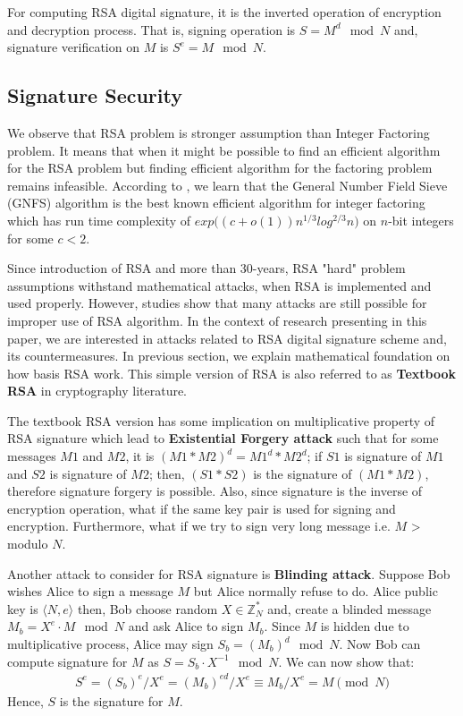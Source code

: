 \documentclass[10pt,sigconf]{acmart}
\newcommand{\Z}{\mathbb{Z}}
\begin{document}
For computing RSA digital signature, it is the inverted operation of encryption and decryption process. That is, signing operation is $S = M^d \mod N$ and, signature verification on $M$ is $S^e = M \mod N$. 

\subsection{Signature Security}

We observe that RSA problem is stronger assumption than Integer Factoring problem. It means that when it might be possible to find an efficient algorithm for the RSA problem but finding efficient algorithm for the factoring problem remains infeasible. According to \cite{case2003beginner}, we learn that the General Number Field Sieve (GNFS) algorithm is the best known efficient algorithm for integer factoring which has run time complexity of $exp\big((c + o(1)) n^{1/3} log^{2/3}n\big)$ on $n$-bit integers for some $c < 2$.

Since introduction of RSA and more than 30-years, RSA "hard" problem assumptions withstand mathematical attacks, when RSA is implemented and used properly. However, studies \cite{boneh1999twenty} \cite{coppersmith1997small} \cite{coron2000new} show that many attacks are still possible for improper use of RSA algorithm. In the context of research presenting in this paper, we are interested in attacks related to RSA digital signature scheme and, its countermeasures. In previous section, we explain mathematical foundation on how basis RSA work. This simple version of RSA is also referred to as \textbf{Textbook RSA} in cryptography literature. 

The textbook RSA version has some implication on multiplicative property of RSA signature which lead to \textbf{Existential Forgery attack} such that for some messages $M1$ and $M2$, it is $(M1 * M2)^d = M1^d * M2^d$; if $S1$ is signature of $M1$ and $S2$ is signature of $M2$; then, $(S1 * S2)$ is the signature of $(M1 * M2)$, therefore signature forgery is possible. Also, since signature is the inverse of encryption operation, what if the same key pair is used for signing and encryption. Furthermore, what if we try to sign very long message i.e. $M$ > modulo $N$.

Another attack to consider for RSA signature is \textbf{Blinding attack}. Suppose Bob wishes Alice to sign a message $M$ but Alice normally refuse to do. Alice public key is $\langle N, e \rangle$ then, Bob choose random $X \in \Z_{N}^*$ and, create a blinded message $M_b = X^e \cdot M \mod N$ and ask Alice to sign $M_b$. Since $M$ is hidden due to multiplicative process, Alice may sign $S_b = (M_{b})^d \mod N$. Now Bob can compute signature for $M$ as $S = S_b \cdot X^{-1} \mod N$. We can now show that: 
\begin{align*}
    S^e = (S_{b})^e / X^{e} = (M_b)^{ed} / X^{e} \equiv M_b / X^{e} = M \pmod N
\end{align*}
Hence, $S$ is the signature for $M$.
\end{document}
